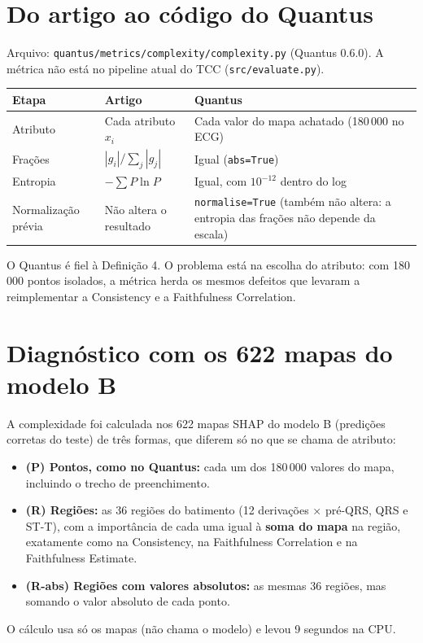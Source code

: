 \documentclass[11pt,a4paper]{article}
\begin{document}
\section{Do artigo ao código do Quantus}
Arquivo: \texttt{quantus/metrics/complexity/complexity.py} (Quantus 0.6.0). A métrica não está no pipeline atual do TCC (\texttt{src/evaluate.py}).
\begin{center}\small
\begin{tabularx}{\linewidth}{lXX}
\toprule
\textbf{Etapa} & \textbf{Artigo} & \textbf{Quantus} \\
\midrule
Atributo & Cada atributo $x_i$ & Cada valor do mapa achatado (180\,000 no ECG) \\
Frações & $|g_i| / \sum_j |g_j|$ & Igual (\texttt{abs=True}) \\
Entropia & $-\sum P \ln P$ & Igual, com $10^{-12}$ dentro do log \\
Normalização prévia & Não altera o resultado & \texttt{normalise=True} (também não altera: a entropia das frações não depende da escala) \\
\bottomrule
\end{tabularx}
\end{center}
O Quantus é fiel à Definição 4. O problema está na escolha do atributo: com 180\,000 pontos isolados, a métrica herda os mesmos defeitos que levaram a reimplementar a Consistency e a Faithfulness Correlation.

\section{Diagnóstico com os 622 mapas do modelo B}
A complexidade foi calculada nos 622 mapas SHAP do modelo B (predições corretas do teste) de três formas, que diferem só no que se chama de atributo:
\begin{itemize}
\item \textbf{(P) Pontos, como no Quantus:} cada um dos 180\,000 valores do mapa, incluindo o trecho de preenchimento.
\item \textbf{(R) Regiões:} as 36 regiões do batimento (12 derivações × pré-QRS, QRS e ST-T), com a importância de cada uma igual à \textbf{soma do mapa} na região, exatamente como na Consistency, na Faithfulness Correlation e na Faithfulness Estimate.
\item \textbf{(R-abs) Regiões com valores absolutos:} as mesmas 36 regiões, mas somando o valor absoluto de cada ponto.
\end{itemize}
O cálculo usa só os mapas (não chama o modelo) e levou 9 segundos na CPU.
\end{document}
